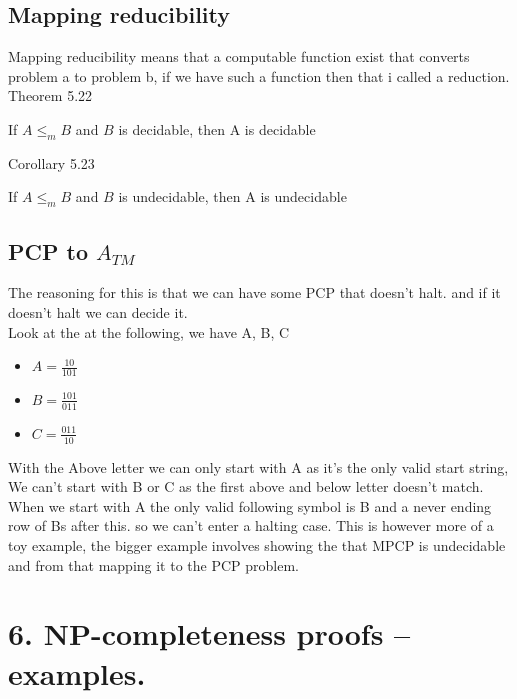 \documentclass[a4paper,10pt,titlepage]{report}
\begin{document}
\subsection{Mapping reducibility}

Mapping reducibility means that a computable function exist that converts problem a to problem b, if we have such a function then that i called a reduction.\\

Theorem 5.22\\
\begin{center}
If $A \leq_m B $ and $ B $ is decidable, then A is decidable 
\end{center}

Corollary 5.23\\
\begin{center}
If $A \leq_m B $ and $ B $ is undecidable, then A is undecidable 
\end{center}

\subsection{PCP to $A_{TM}$}


The reasoning for this is that we can have some PCP that doesn't halt. and if it doesn't halt we can decide it. \\

Look at the at the following, we have A, B, C\\
\begin{itemize}
\item $ A = \frac{10}{101}$
\item $ B = \frac{101}{011}$
\item $ C = \frac{011}{10} $
\end{itemize}

With the Above letter we can only start with A as it's the only valid start string, We can't start with B or C as the first above and below letter doesn't match.\\

When we start with A the only valid following symbol is B and a never ending row of Bs after this. so we can't enter a halting case. This is however more of a toy example, the bigger example involves showing the that MPCP is undecidable and from that mapping it to the PCP problem.\\





\newpage
\section{6. NP-completeness proofs – examples.}
\end{document}
